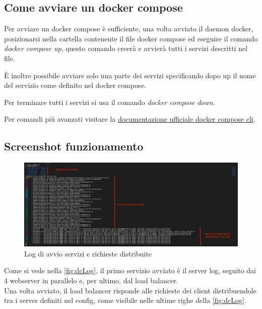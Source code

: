 \documentclass[../DocumentazioneProgetto.tex]{subfiles}
\begin{document}
	\subsection{Come avviare un docker compose} 
	Per avviare un docker compose è sufficiente, una volta avviato il daemon docker, posizionarsi nella cartella contenente il file docker compose ed eseguire 
	il comando \textit{docker compose up}, questo comando creerà e avvierà tutti i servizi descritti nel file. 

	È inoltre possibile avviare solo una parte dei servizi specificando dopo up il nome del servizio come definito nel docker compose.

	Per terminare tutti i servizi si usa il comando \textit{docker compose down}.

	Per comandi più avanzati visitare la \href{https://docs.docker.com/compose/reference/}{documentazione ufficiale docker compose cli}.

	\subsection{Screenshot funzionamento} 
	\begin{figure}[ht]
		\includegraphics[width=15cm]{images/dcLog.png}
		\centering
		\caption{Log di avvio servizi e richieste distribuite}
		\label{fig:dcLog}
	\end{figure}
	Come si vede nella \autoref{fig:dcLog}, il primo servizio avviato è il server log, seguito dai 4 webserver in parallelo e, per ultimo, dal load balancer.\\
	Una volta avviato, il load balancer risponde alle richieste dei client distribuendole tra i server definiti nel config, come visibile nelle ultime righe della \autoref{fig:dcLog}.
\end{document}
